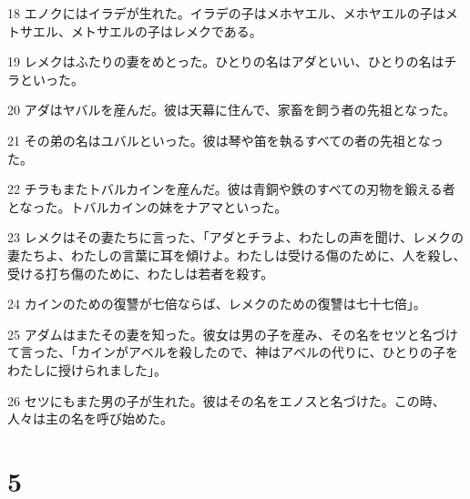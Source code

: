 \par 18 エノクにはイラデが生れた。イラデの子はメホヤエル、メホヤエルの子はメトサエル、メトサエルの子はレメクである。
\par 19 レメクはふたりの妻をめとった。ひとりの名はアダといい、ひとりの名はチラといった。
\par 20 アダはヤバルを産んだ。彼は天幕に住んで、家畜を飼う者の先祖となった。
\par 21 その弟の名はユバルといった。彼は琴や笛を執るすべての者の先祖となった。
\par 22 チラもまたトバルカインを産んだ。彼は青銅や鉄のすべての刃物を鍛える者となった。トバルカインの妹をナアマといった。
\par 23 レメクはその妻たちに言った、「アダとチラよ、わたしの声を聞け、レメクの妻たちよ、わたしの言葉に耳を傾けよ。わたしは受ける傷のために、人を殺し、受ける打ち傷のために、わたしは若者を殺す。
\par 24 カインのための復讐が七倍ならば、レメクのための復讐は七十七倍」。
\par 25 アダムはまたその妻を知った。彼女は男の子を産み、その名をセツと名づけて言った、「カインがアベルを殺したので、神はアベルの代りに、ひとりの子をわたしに授けられました」。
\par 26 セツにもまた男の子が生れた。彼はその名をエノスと名づけた。この時、人々は主の名を呼び始めた。

\chapter{5}

